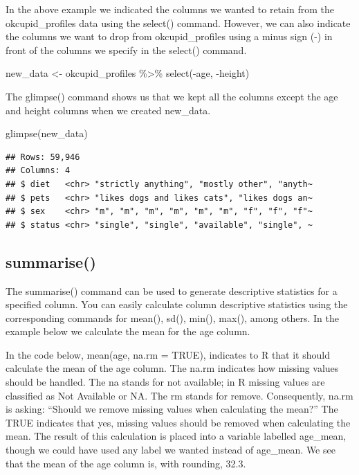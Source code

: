 \documentclass[
]{krantz}
\makeatletter
\newenvironment{Shaded}{\begin{snugshade}}{\end{snugshade}}
\newcommand{\FunctionTok}[1]{\textcolor[rgb]{0,0,0}{#1}}
\newcommand{\NormalTok}[1]{#1}
\newcommand{\OtherTok}[1]{\textcolor[rgb]{0.37,0.37,0.37}{#1}}
\newcommand{\SpecialCharTok}[1]{\textcolor[rgb]{0,0,0}{#1}}
\newenvironment{kframe}{%
\medskip{}
\setlength{\fboxsep}{.8em}
 \def\at@end@of@kframe{}%
 \ifinner\ifhmode%
  \def\at@end@of@kframe{\end{minipage}}%
  \begin{minipage}{\columnwidth}%
 \fi\fi%
 \def\FrameCommand##1{\hskip\@totalleftmargin \hskip-\fboxsep
 \colorbox{shadecolor}{##1}\hskip-\fboxsep
     \hskip-\linewidth \hskip-\@totalleftmargin \hskip\columnwidth}%
 \MakeFramed {\advance\hsize-\width
   \@totalleftmargin\z@ \linewidth\hsize
   \@setminipage}}%
 {\par\unskip\endMakeFramed%
 \at@end@of@kframe}
\renewenvironment{Shaded}{\begin{kframe}}{\end{kframe}}
\makeatother
\begin{document}
In the above example we indicated the columns we wanted to retain from the okcupid\_profiles data using the select() command. However, we can also indicate the columns we want to drop from okcupid\_profiles using a minus sign (-) in front of the columns we specify in the select() command.

\begin{Shaded}
\begin{Highlighting}[]
\NormalTok{new\_data }\OtherTok{\textless{}{-}}\NormalTok{ okcupid\_profiles }\SpecialCharTok{\%\textgreater{}\%} \FunctionTok{select}\NormalTok{(}\SpecialCharTok{{-}}\NormalTok{age, }\SpecialCharTok{{-}}\NormalTok{height)}
\end{Highlighting}
\end{Shaded}

The glimpse() command shows us that we kept all the columns except the age and height columns when we created new\_data.

\begin{Shaded}
\begin{Highlighting}[]
\FunctionTok{glimpse}\NormalTok{(new\_data)}
\end{Highlighting}
\end{Shaded}

\begin{verbatim}
## Rows: 59,946
## Columns: 4
## $ diet   <chr> "strictly anything", "mostly other", "anyth~
## $ pets   <chr> "likes dogs and likes cats", "likes dogs an~
## $ sex    <chr> "m", "m", "m", "m", "m", "m", "f", "f", "f"~
## $ status <chr> "single", "single", "available", "single", ~
\end{verbatim}

\hypertarget{summarise}{%
\subsection{summarise()}\label{summarise}}

The summarise() command can be used to generate descriptive statistics for a specified column. You can easily calculate column descriptive statistics using the corresponding commands for mean(), sd(), min(), max(), among others. In the example below we calculate the mean for the age column.

In the code below, mean(age, na.rm = TRUE), indicates to R that it should calculate the mean of the age column. The na.rm indicates how missing values should be handled. The na stands for not available; in R missing values are classified as Not Available or NA. The rm stands for remove. Consequently, na.rm is asking: ``Should we remove missing values when calculating the mean?'' The TRUE indicates that yes, missing values should be removed when calculating the mean. The result of this calculation is placed into a variable labelled age\_mean, though we could have used any label we wanted instead of age\_mean. We see that the mean of the age column is, with rounding, 32.3.
\end{document}
